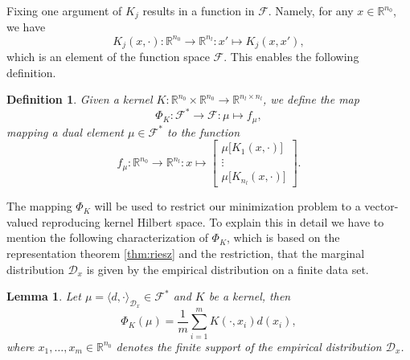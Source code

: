 \documentclass[11pt, a4paper]{article}
\newtheorem{lemma}[theorem]{Lemma}
\newtheorem{definition}[theorem]{Definition}
\newcommand{\R}{\mathbb{R}}
\newcommand{\D}{\mathcal{D}}
\newcommand{\F}{\mathcal{F}}
\begin{document}
Fixing one argument of $K_j$ results in a function in $\F$. Namely, for any $x \in \R^{n_0}$, we have
\[ K_j(x,\cdot) : \R^{n_0} \to \R^{n_l} : x' \mapsto K_j(x,x'), \]
which is an element of the function space $\F$. This enables the following definition.

\begin{definition} \label{def:phi}
Given a kernel $K: \R^{n_0} \times \R^{n_0} \to \R^{n_l \times n_l}$, we define the map
\[ \Phi_K : \F^* \to \F : \mu \mapsto f_{\mu}, \]
mapping a dual element $\mu \in \F^*$ to the function
\[ f_{\mu} : \R^{n_0} \to \R^{n_l} : x \mapsto  \begin{bmatrix} \mu \big [K_1(x,\cdot) \big ] \\ \vdots \\ \mu \big [ K_{n_l}(x,\cdot) \big ] \end{bmatrix}. \]
\end{definition}

The mapping $\Phi_K$ will be used to restrict our minimization problem to a vector-valued reproducing kernel Hilbert space. To explain this in detail we have to mention the following characterization of $\Phi_K$, which is based on the representation theorem \ref{thm:riesz} and the restriction, that the marginal distribution $\D_x$ is given by the empirical distribution on a finite data set.

\begin{lemma} \label{lem:phi}
Let $\mu = \langle d, \cdot \rangle_{\D_x} \in \F^*$ and $K$ be a kernel, then
\[ \Phi_K(\mu) = \frac{1}{m}\sum_{i=1}^{m} K(\cdot,x_i)d(x_i), \]
where $x_1, \dots, x_m \in \R^{n_0}$ denotes the finite support of the empirical distribution $\D_x$.
\end{lemma}
\end{document}

